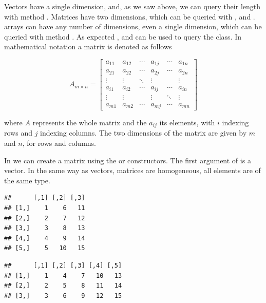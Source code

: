 \documentclass[krantz2]{krantz}\usepackage{knitr}
\begin{document}
Vectors have a single dimension, and, as we saw above, we can query their length with method . Matrices have two dimensions, which can be queried with ,  and . \Rlang arrays can have any number of dimensions, even a single dimension, which can be queried with method . As expected ,  and  can be used to query the class. In mathematical notation a matrix is denoted as follows

\begin{equation*}
  A_{m\times n} =
  \begin{bmatrix}
    a_{11} & a_{12} & \cdots & a_{1j} & \cdots & a_{1n}\\
    a_{21} & a_{22} & \cdots & a_{2j} & \cdots & a_{2n}\\
    \vdots & \vdots & \ddots & \vdots &        & \vdots \\
   a_{i1} & a_{i2} & \cdots & a_{ij} & \cdots & a_{in}\\
     \vdots & \vdots &      & \vdots &  \ddots & \vdots \\
   a_{m1} & a_{m2} & \cdots & a_{mj} & \cdots & a_{mn}
  \end{bmatrix}
\end{equation*}

where $A$ represents the whole matrix and the $a_{ij}$ its elements, with $i$ indexing rows and $j$ indexing columns. The two dimensions of the matrix are given by $m$ and $n$, for rows and columns.

In \Rlang we can create a matrix using the  or  constructors. The first argument of  is a vector. In the same way as vectors, matrices are homogeneous, all elements are of the same type.

\begin{knitrout}\footnotesize
{}\color{fgcolor}\begin{kframe}
\begin{alltt}
\hlstd{(}\hlopt{:}\hlstd{,}  \hlstd{=} \hlstd{)}
\end{alltt}
\begin{verbatim}
##      [,1] [,2] [,3]
## [1,]    1    6   11
## [2,]    2    7   12
## [3,]    3    8   13
## [4,]    4    9   14
## [5,]    5   10   15
\end{verbatim}
\begin{alltt}
\hlstd{(}\hlopt{:}\hlstd{,}  \hlstd{=} \hlstd{)}
\end{alltt}
\begin{verbatim}
##      [,1] [,2] [,3] [,4] [,5]
## [1,]    1    4    7   10   13
## [2,]    2    5    8   11   14
## [3,]    3    6    9   12   15
\end{verbatim}
\end{kframe}
\end{knitrout}
\end{document}
